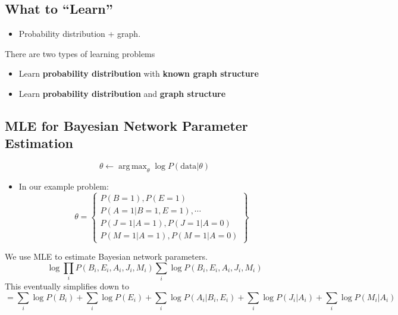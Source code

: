 \documentclass[10pt]{article}
\DeclareMathOperator*{\argmax}{arg\,max}
\begin{document}
\subsection*{What to ``Learn''}
\begin{itemize}
	\item Probability distribution + graph.
\end{itemize}
There are two types of learning problems
\begin{itemize}
	\item Learn \textbf{probability distribution} with \textbf{known graph structure}
	\item Learn \textbf{probability distribution} and \textbf{graph structure}
\end{itemize}

\subsection*{MLE for Bayesian Network Parameter Estimation}
\[\theta \leftarrow \argmax_\theta \log P(\text{data} | \theta)\]
\begin{itemize}
	\item In our example problem:
	\[\theta = \begin{Bmatrix} P(B = 1), P(E = 1) \\ P(A = 1 | B = 1, E = 1), \cdots \\ P(J = 1 | A = 1), P(J = 1 | A = 0) \\ P(M = 1 | A = 1), P(M = 1 | A = 0) \end{Bmatrix}\]
\end{itemize}
We use MLE to estimate Bayesian network parameters.
\[\log \prod_i P(B_i, E_i, A_i, J_i, M_i) \sum_i \log P(B_i, E_i, A_i, J_i, M_i)\]
This eventually simplifies down to
\[= \sum_i \log P(B_i) + \sum_i \log P(E_i) + \sum_i \log P(A_i | B_i, E_i) + \sum_i \log P(J_i | A_i) + \sum_i \log P(M_i | A_i)\]
\end{document}
